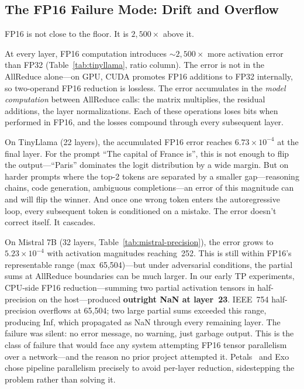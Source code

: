 \documentclass[10pt,twocolumn]{article}
\begin{document}
\subsection{The FP16 Failure Mode: Drift and Overflow}\label{sec:prec-fp16}

FP16 is not close to the floor.  It is $2{,}500\times$ above it.

At every layer, FP16 computation introduces $\sim$\!$2{,}500\times$ more
activation error than FP32 (Table~\ref{tab:tinyllama}, ratio column).  The
error is not in the AllReduce alone---on GPU, CUDA promotes FP16 additions
to FP32 internally, so two-operand FP16 reduction is lossless.  The error
accumulates in the \emph{model computation} between AllReduce calls: the
matrix multiplies, the residual additions, the layer normalizations.  Each
of these operations loses bits when performed in FP16, and the losses
compound through every subsequent layer.

On TinyLlama (22 layers), the accumulated FP16 error reaches
$6.73\!\times\!10^{-4}$ at the final layer.  For the prompt ``The capital
of France is'', this is not enough to flip the output---``Paris''
dominates the logit distribution by a wide margin.  But on harder prompts
where the top-2 tokens are separated by a smaller gap---reasoning chains,
code generation, ambiguous completions---an error of this magnitude can and
will flip the winner.  And once one wrong token enters the autoregressive
loop, every subsequent token is conditioned on a mistake.  The error
doesn't correct itself.  It cascades.

On Mistral 7B (32 layers, Table~\ref{tab:mistral-precision}), the error
grows to $5.23\!\times\!10^{-4}$ with activation magnitudes reaching~252.
This is still within FP16's representable range (max~65,504)---but under
adversarial conditions, the partial sums at AllReduce boundaries can be
much larger.  In our early TP experiments, CPU-side FP16
reduction---summing two partial activation tensors in half-precision on the
host---produced \textbf{outright NaN at layer~23}.  IEEE~754
half-precision overflows at 65,504; two large partial sums exceeded this
range, producing Inf, which propagated as NaN through every remaining
layer.  The failure was silent: no error message, no warning, just garbage
output.  This is the class of failure that would face any system attempting
FP16 tensor parallelism over a network---and the reason no prior project
attempted it.  Petals~\citep{borzunov2023petals} and
Exo~\citep{exo2024} chose pipeline parallelism precisely to avoid
per-layer reduction, sidestepping the problem rather than solving it.
\end{document}
